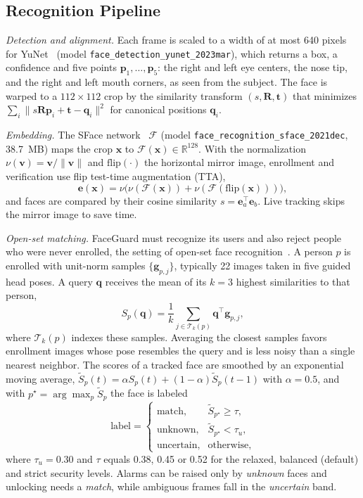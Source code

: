 \documentclass[journal]{IEEEtran}
\newcommand{\sys}{FaceGuard}
\begin{document}
\subsection{Recognition Pipeline}\label{sec:recog}
\emph{Detection and alignment.} Each frame is scaled to a width of at most 640 pixels for YuNet~\cite{wu2023yunet} (model \texttt{face\_detection\_yunet\_2023mar}), which returns a box, a confidence and five points $\mathbf{p}_1,\dots,\mathbf{p}_5$: the right and left eye centers, the nose tip, and the right and left mouth corners, as seen from the subject. The face is warped to a $112\times112$ crop by the similarity transform $(s,\mathbf{R},\mathbf{t})$ that minimizes $\sum_i \lVert s\mathbf{R}\mathbf{p}_i+\mathbf{t}-\mathbf{q}_i\rVert^2$ for canonical positions $\mathbf{q}_i$.

\emph{Embedding.} The SFace network~\cite{zhong2021sface} $\mathcal{F}$ (model \texttt{face\_recognition\_sface\_2021dec}, 38.7~MB) maps the crop $\mathbf{x}$ to $\mathcal{F}(\mathbf{x})\in\mathbb{R}^{128}$. With the normalization $\nu(\mathbf{v})=\mathbf{v}/\lVert\mathbf{v}\rVert$ and $\mathrm{flip}(\cdot)$ the horizontal mirror image, enrollment and verification use flip test-time augmentation (TTA),
\begin{equation}
\mathbf{e}(\mathbf{x}) = \nu\bigl(\nu(\mathcal{F}(\mathbf{x}))+\nu(\mathcal{F}(\mathrm{flip}(\mathbf{x})))\bigr),
\end{equation}
and faces are compared by their cosine similarity $s=\mathbf{e}_a^\top\mathbf{e}_b$. Live tracking skips the mirror image to save time.

\emph{Open-set matching.} \sys{} must recognize its users and also reject people who were never enrolled, the setting of open-set face recognition~\cite{gunther2017openset}. A person $p$ is enrolled with unit-norm samples $\{\mathbf{g}_{p,j}\}$, typically 22 images taken in five guided head poses. A query $\mathbf{q}$ receives the mean of its $k=3$ highest similarities to that person,
\begin{equation}
S_p(\mathbf{q})=\frac{1}{k}\sum_{j\in\mathcal{T}_k(p)}\mathbf{q}^\top\mathbf{g}_{p,j},
\end{equation}
where $\mathcal{T}_k(p)$ indexes these samples. Averaging the closest samples favors enrollment images whose pose resembles the query and is less noisy than a single nearest neighbor. The scores of a tracked face are smoothed by an exponential moving average, $\tilde{S}_p(t)=\alpha S_p(t)+(1-\alpha)\tilde{S}_p(t-1)$ with $\alpha=0.5$, and with $p^\star=\arg\max_p\tilde{S}_p$ the face is labeled
\begin{equation}
\text{label}=\begin{cases}
\text{match}, & \tilde{S}_{p^\star}\ge\tau,\\
\text{unknown}, & \tilde{S}_{p^\star}<\tau_u,\\
\text{uncertain}, & \text{otherwise,}
\end{cases}
\end{equation}
where $\tau_u=0.30$ and $\tau$ equals 0.38, 0.45 or 0.52 for the relaxed, balanced (default) and strict security levels. Alarms can be raised only by \emph{unknown} faces and unlocking needs a \emph{match}, while ambiguous frames fall in the \emph{uncertain} band.
\end{document}
